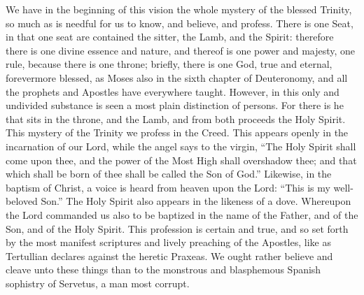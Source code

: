 We have in the beginning of this vision the whole mystery of the blessed Trinity, so much as is needful for us to know, and believe, and profess. There is one Seat, in that one seat are contained the sitter, the Lamb, and the Spirit: therefore there is one divine essence and nature, and thereof is one power and majesty, one rule, because there is one throne; briefly, there is one God, true and eternal, forevermore blessed, as Moses also in the sixth chapter of Deuteronomy, and all the prophets and Apostles have everywhere taught. However, in this only and undivided substance is seen a most plain distinction of persons. For there is he that sits in the throne, and the Lamb, and from both proceeds the Holy Spirit. This mystery of the Trinity we profess in the Creed. This appears openly in the incarnation of our Lord, while the angel says to the virgin, “The Holy Spirit shall come upon thee, and the power of the Most High shall overshadow thee; and that which shall be born of thee shall be called the Son of God.” Likewise, in the baptism of Christ, a voice is heard from heaven upon the Lord: “This is my well-beloved Son.” The Holy Spirit also appears in the likeness of a dove. Whereupon the Lord commanded us also to be baptized in the name of the Father, and of the Son, and of the Holy Spirit. This profession is certain and true, and so set forth by the most manifest scriptures and lively preaching of the Apostles, like as Tertullian declares against the heretic Praxeas. We ought rather believe and cleave unto these things than to the monstrous and blasphemous Spanish sophistry of Servetus, a man most corrupt.

